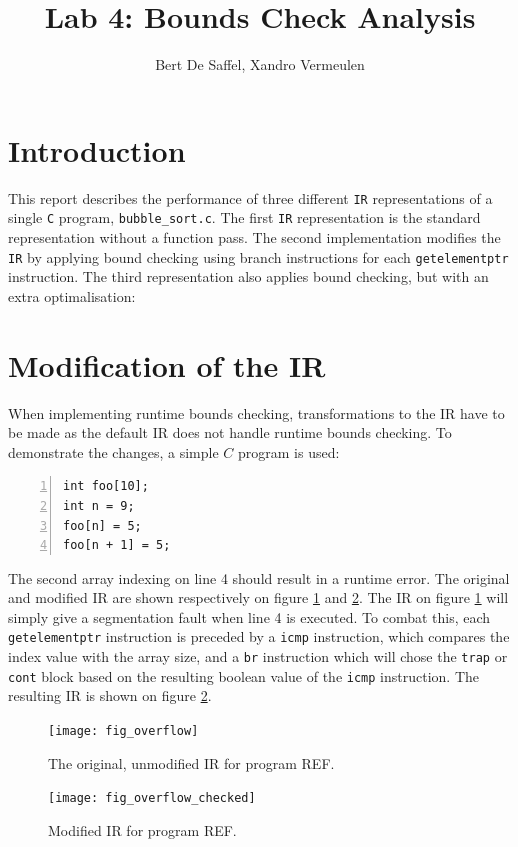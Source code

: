 \documentclass{article}
\title{Lab 4: Bounds Check Analysis}
\author{Bert De Saffel, Xandro Vermeulen}
\begin{document}
	\maketitle
	\tableofcontents
	
	\section{Introduction}
	This report describes the performance of three different \texttt{IR} representations of a single \texttt{C} program, \texttt{bubble\_sort.c}. The first \texttt{IR} representation is the standard representation without a function pass. The second implementation modifies the \texttt{IR} by applying bound checking using branch instructions for each \texttt{getelementptr} instruction. The third representation also applies bound checking, but with an extra optimalisation: 
	
	\section{Modification of the IR}
	When implementing runtime bounds checking, transformations to the IR have to be made as the default IR does not handle runtime bounds checking. To demonstrate the changes, a simple $C$ program is used:
	\begin{lstlisting}[numbers=left]
int foo[10];
int n = 9;
foo[n] = 5;
foo[n + 1] = 5;
	\end{lstlisting}
The second array indexing on line 4 should result in a runtime error. The original and modified IR are shown respectively on figure \ref{fig:original_ir} and \ref{fig:modified_ir}. The IR on figure \ref{fig:original_ir} will simply give a segmentation fault when line 4 is executed. To combat this, each \texttt{getelementptr} instruction is preceded by a \texttt{icmp} instruction, which compares the index value with the array size, and a \texttt{br} instruction which will chose the \texttt{trap} or \texttt{cont} block based on the resulting boolean value of the \texttt{icmp} instruction. The resulting IR is shown on figure \ref{fig:modified_ir}.

\begin{figure}
	\texttt{[image: fig\_overflow]}
	\caption{The original, unmodified IR for program REF.}
	\label{fig:original_ir}
\end{figure}

\begin{figure}
	\texttt{[image: fig\_overflow\_checked]}
	\caption{Modified IR for program REF.}
	\label{fig:modified_ir}
\end{figure}
\end{document}
